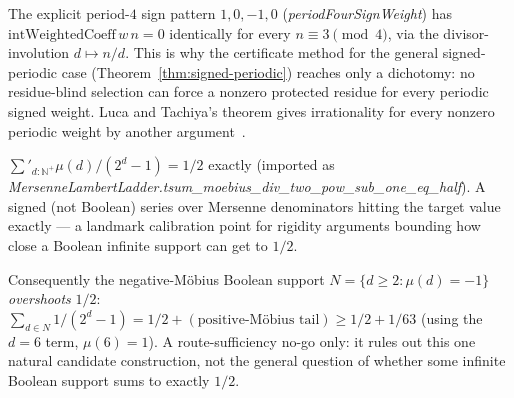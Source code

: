 \begin{obs}
\label{obs:period-four-obstruction}
The explicit period-$4$ sign pattern $1,0,-1,0$ (\emph{periodFourSignWeight}) has
$\mathrm{intWeightedCoeff}\,w\,n = 0$ identically for every $n\equiv 3\pmod 4$, via the
divisor-involution $d\mapsto n/d$. This is why the certificate method for the general signed-periodic case
(Theorem~\ref{thm:signed-periodic}) reaches only a dichotomy: no residue-blind selection can
force a nonzero protected residue for every periodic signed weight. Luca and Tachiya's theorem
gives irrationality for every nonzero periodic weight by another
argument~\cite[Theorem~A, p.~139]{lucatachiya2017}.
\par{}
\end{obs}

\begin{thm}
\label{thm:mobius-lambert-identity}
$\sum'_{d:\mathbb N^+} \mu(d)/(2^d-1) = 1/2$ exactly (imported as
\emph{MersenneLambertLadder.tsum\_moebius\_div\_two\_pow\_sub\_one\_eq\_half}). A signed
(not Boolean) series over Mersenne denominators hitting the target value exactly — a
landmark calibration point for rigidity arguments bounding how close a Boolean infinite
support can get to $1/2$.
\par{}
\end{thm}

\begin{cor}
\label{cor:negative-mobius-overshoot}
Consequently the negative-M\"obius Boolean support $N=\{d\ge 2:\mu(d)=-1\}$
\emph{overshoots} $1/2$: $\sum_{d\in N} 1/(2^d-1) = 1/2 + (\text{positive-M\"obius tail})
\ge 1/2 + 1/63$ (using the $d=6$ term, $\mu(6)=1$). A route-sufficiency no-go only: it
rules out this one natural candidate construction, not the general question of whether
some infinite Boolean support sums to exactly $1/2$.
\par{}
\end{cor}


